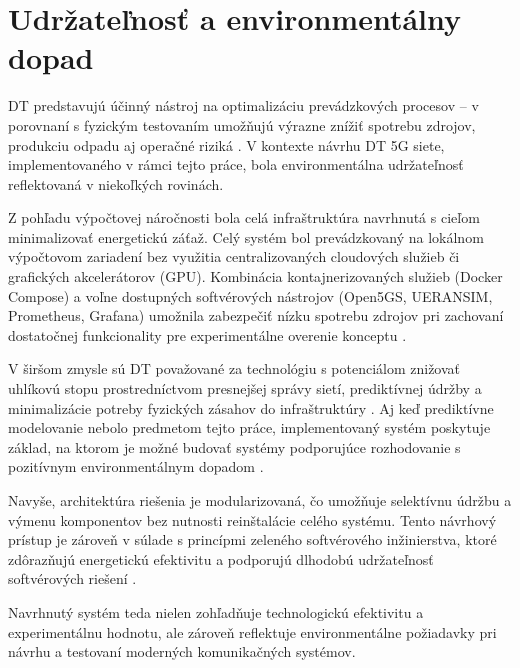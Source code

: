 \section{Udržateľnosť a environmentálny dopad}
DT predstavujú účinný nástroj na optimalizáciu prevádzkových procesov – v porovnaní s fyzickým testovaním umožňujú výrazne znížiť spotrebu zdrojov, produkciu odpadu aj operačné riziká \cite{enviro_raw_materials}. V kontexte návrhu DT 5G siete, implementovaného v rámci tejto práce, bola environmentálna udržateľnosť reflektovaná v niekoľkých rovinách.

Z pohľadu výpočtovej náročnosti bola celá infraštruktúra navrhnutá s cieľom minimalizovať energetickú záťaž. Celý systém bol prevádzkovaný na lokálnom výpočtovom zariadení bez využitia centralizovaných cloudových služieb či grafických akcelerátorov (GPU). Kombinácia kontajnerizovaných služieb (Docker Compose) a voľne dostupných softvérových nástrojov (Open5GS, UERANSIM, Prometheus, Grafana) umožnila zabezpečiť nízku spotrebu zdrojov \cite{docker_enviro} pri zachovaní dostatočnej funkcionality pre experimentálne overenie konceptu \cite{docker_enviro_2}.

V širšom zmysle sú DT považované za technológiu s potenciálom znižovať uhlíkovú stopu prostredníctvom presnejšej správy sietí, prediktívnej údržby a minimalizácie potreby fyzických zásahov do infraštruktúry \cite{DT_edge_networks_IoT, enviro}. Aj keď prediktívne modelovanie nebolo predmetom tejto práce, implementovaný systém poskytuje základ, na ktorom je možné budovať systémy podporujúce rozhodovanie s pozitívnym environmentálnym dopadom \cite{malaysia_enviro}.

Navyše, architektúra riešenia je modularizovaná, čo umožňuje selektívnu údržbu a výmenu komponentov bez nutnosti reinštalácie celého systému. Tento návrhový prístup je zároveň v súlade s princípmi zeleného softvérového inžinierstva, ktoré zdôrazňujú energetickú efektivitu a podporujú dlhodobú udržateľnosť softvérových riešení \cite{modular_sw}.

Navrhnutý systém teda nielen zohľadňuje technologickú efektivitu a experimentálnu hodnotu, ale zároveň reflektuje environmentálne požiadavky pri návrhu a testovaní moderných komunikačných systémov.